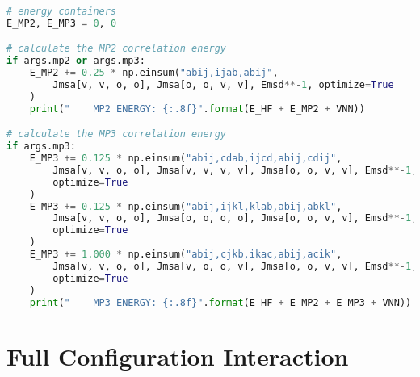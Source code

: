 \raggedbottom\begin{lstlisting}[language=Python, caption={\acrshort{mp2} and \acrshort{mp3} exercise code solution.}, label=code:mp_solution]
# energy containers
E_MP2, E_MP3 = 0, 0

# calculate the MP2 correlation energy
if args.mp2 or args.mp3:
    E_MP2 += 0.25 * np.einsum("abij,ijab,abij",
        Jmsa[v, v, o, o], Jmsa[o, o, v, v], Emsd**-1, optimize=True
    )
    print("    MP2 ENERGY: {:.8f}".format(E_HF + E_MP2 + VNN))

# calculate the MP3 correlation energy
if args.mp3:
    E_MP3 += 0.125 * np.einsum("abij,cdab,ijcd,abij,cdij",
        Jmsa[v, v, o, o], Jmsa[v, v, v, v], Jmsa[o, o, v, v], Emsd**-1, Emsd**-1,
        optimize=True
    )
    E_MP3 += 0.125 * np.einsum("abij,ijkl,klab,abij,abkl",
        Jmsa[v, v, o, o], Jmsa[o, o, o, o], Jmsa[o, o, v, v], Emsd**-1, Emsd**-1,
        optimize=True
    )
    E_MP3 += 1.000 * np.einsum("abij,cjkb,ikac,abij,acik",
        Jmsa[v, v, o, o], Jmsa[v, o, o, v], Jmsa[o, o, v, v], Emsd**-1, Emsd**-1,
        optimize=True
    )
    print("    MP3 ENERGY: {:.8f}".format(E_HF + E_MP2 + E_MP3 + VNN))
\end{lstlisting}

\section{\texorpdfstring{Full Configuration Interaction\label{sec:ci_code_solution}}{Full Configuration Interaction}}

